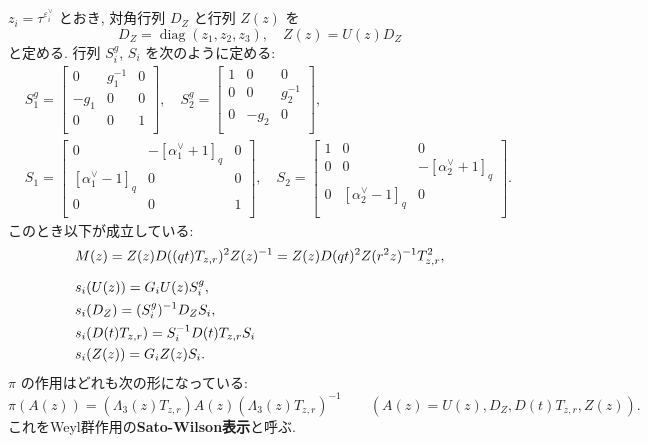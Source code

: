 \documentclass[12pt,twoside,dvipdfm]{msjproc}
\theoremstyle{definition} %
\theoremstyle{definition} %
\theoremstyle{definition} %
\numberwithin{theorem}{section}
\numberwithin{equation}{section}
\numberwithin{figure}{section}
\numberwithin{table}{section}
\newcommand\diag{\mathop{\mathrm{diag}}\nolimits}
\newcommand\ev{\varepsilon^\vee}
\newcommand\av{\alpha^\vee}
\begin{document}
$z_i=\tau^{\ev_i}$ とおき, 対角行列 $D_Z$ と行列 $Z(z)$ を
\begin{equation*}
  D_Z=\diag(z_1,z_2,z_3), \quad Z(z) = U(z)D_Z
\end{equation*} 
と定める. 行列 $S^g_i$, $S_i$ を次のように定める:
\begin{align*}
 &
 S^g_1 =
 \begin{bmatrix}
   0    & g_1^{-1} & 0 \\
   -g_1 & 0        & 0 \\
   0    & 0        & 1 \\
 \end{bmatrix},
 \quad
 S^g_2 =
 \begin{bmatrix}
   1 & 0 & 0 \\
   0 & 0 & g_2^{-1} \\
   0 & -g_2 & 0 \\
 \end{bmatrix},
 \\ &
 S_1 =
 \begin{bmatrix}
   0           & -[\av_1+1]_q & 0 \\
   [\av_1-1]_q & 0        & 0 \\
   0           & 0        & 1 \\
 \end{bmatrix},
 \quad
 S_2 =
 \begin{bmatrix}
   1 & 0           & 0 \\
   0 & 0           & -[\av_2+1]_q \\
   0 & [\av_2-1]_q & 0 \\
 \end{bmatrix}.
\end{align*}
このとき以下が成立している:
\begin{align*}
 &
 M(z)
 = Z(z)D((qt)T_{z,r})^2 Z(z)^{-1}
 = Z(z)D(qt)^2Z(r^2z)^{-1}T_{z,r}^2,
 \\[\medskipamount] &
 s_i(U(z)) = G_i U(z) S^g_i, 
 \\ &
 s_i(D_Z) = (S^g_i)^{-1} D_Z S_i, \
 \\ &
 s_i(D(t)T_{z,r}) = S_i^{-1} D(t)T_{z,r} S_i
 \\ &
 s_i(Z(z)) = G_i Z(z) S_i.
\end{align*}
$\pi$ の作用はどれも次の形になっている:
\begin{equation*}
  \pi(A(z)) = (\Lambda_3(z)T_{z,r})A(z)(\Lambda_3(z)T_{z,r})^{-1} \qquad
  (A(z)=U(z),D_Z,D(t)T_{z,r},Z(z)).
\end{equation*}
これをWeyl群作用の{\bf Sato-Wilson表示}と呼ぶ.
\end{document}
